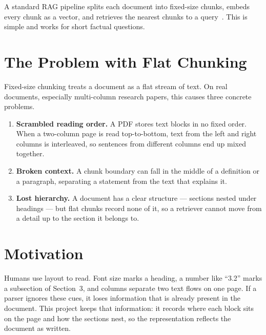 \documentclass[12pt,a4paper]{report}
\begin{document}
A standard RAG pipeline splits each document into fixed-size chunks, embeds every chunk
as a vector, and retrieves the nearest chunks to a query~\cite{borgeaud2022retro,izacard2023atlas}.
This is simple and works for short factual questions.

\section{The Problem with Flat Chunking}
Fixed-size chunking treats a document as a flat stream of text. On real documents,
especially multi-column research papers, this causes three concrete problems.
\begin{enumerate}
  \item \textbf{Scrambled reading order.} A PDF stores text blocks in no fixed order.
  When a two-column page is read top-to-bottom, text from the left and right columns is
  interleaved, so sentences from different columns end up mixed together.
  \item \textbf{Broken context.} A chunk boundary can fall in the middle of a definition
  or a paragraph, separating a statement from the text that explains it.
  \item \textbf{Lost hierarchy.} A document has a clear structure --- sections nested
  under headings --- but flat chunks record none of it, so a retriever cannot move from a
  detail up to the section it belongs to.
\end{enumerate}

\section{Motivation}
Humans use layout to read. Font size marks a heading, a number like ``3.2'' marks a
subsection of Section~3, and columns separate two text flows on one page. If a parser
ignores these cues, it loses information that is already present in the document. This
project keeps that information: it records where each block sits on the page and how the
sections nest, so the representation reflects the document as written.
\end{document}
